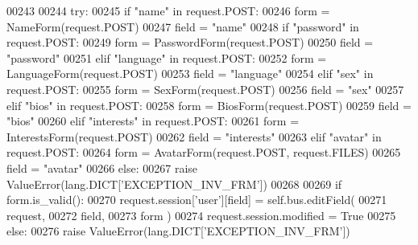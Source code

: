\begin{DoxyCode}
00243 
00244             \textcolor{keywordflow}{try}:
00245                 \textcolor{keywordflow}{if}   \textcolor{stringliteral}{"name"} \textcolor{keywordflow}{in} request.POST:
00246                     form = NameForm(request.POST)
00247                     field = \textcolor{stringliteral}{"name"}
00248                 \textcolor{keywordflow}{if}  \textcolor{stringliteral}{"password"} \textcolor{keywordflow}{in} request.POST:
00249                     form = PasswordForm(request.POST)
00250                     field = \textcolor{stringliteral}{"password"}
00251                 \textcolor{keywordflow}{elif} \textcolor{stringliteral}{"language"} \textcolor{keywordflow}{in} request.POST:
00252                     form = LanguageForm(request.POST)
00253                     field = \textcolor{stringliteral}{"language"}
00254                 \textcolor{keywordflow}{elif} \textcolor{stringliteral}{"sex"} \textcolor{keywordflow}{in} request.POST:
00255                     form = SexForm(request.POST)
00256                     field = \textcolor{stringliteral}{"sex"}
00257                 \textcolor{keywordflow}{elif} \textcolor{stringliteral}{"bios"} \textcolor{keywordflow}{in} request.POST:
00258                     form = BiosForm(request.POST)
00259                     field = \textcolor{stringliteral}{"bios"}
00260                 \textcolor{keywordflow}{elif} \textcolor{stringliteral}{"interests"} \textcolor{keywordflow}{in} request.POST:
00261                     form = InterestsForm(request.POST)
00262                     field = \textcolor{stringliteral}{"interests"}
00263                 \textcolor{keywordflow}{elif} \textcolor{stringliteral}{"avatar"} \textcolor{keywordflow}{in} request.POST:
00264                     form = AvatarForm(request.POST, request.FILES)
00265                     field = \textcolor{stringliteral}{"avatar"}
00266                 \textcolor{keywordflow}{else}:
00267                     \textcolor{keywordflow}{raise} ValueError(lang.DICT[\textcolor{stringliteral}{'EXCEPTION\_INV\_FRM'}])
00268 
00269                 \textcolor{keywordflow}{if} form.is\_valid():
00270                     request.session[\textcolor{stringliteral}{'user'}][field] = self.bus.editField(
00271                                                         request, 
00272                                                         field, 
00273                                                         form )
00274                     request.session.modified = \textcolor{keyword}{True}
00275                 \textcolor{keywordflow}{else}:
00276                     \textcolor{keywordflow}{raise} ValueError(lang.DICT[\textcolor{stringliteral}{'EXCEPTION\_INV\_FRM'}])

\end{DoxyCode}
